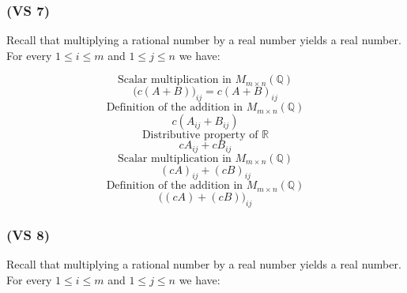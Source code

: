 \documentclass{article}
\begin{document}
\subsubsection*{(VS 7)}
Recall that multiplying a rational number by a real number yields a real number.
For every \(1 \leq i \leq m\) and \(1 \leq j \leq n\) we have:

\begin{equation*}
    \text{Scalar multiplication in \(M_{m \times n}(\mathbb{Q})\)}
\end{equation*}
\begin{equation*}
    \Big(c(A + B)\Big)_{ij} = c(A + B)_{ij}
\end{equation*}
\begin{equation*}
    \text{Definition of the addition in \(M_{m \times n}(\mathbb{Q})\)}
\end{equation*}
\begin{equation*}
    c(A_{ij} + B_{ij})
\end{equation*}
\begin{equation*}
    \text{Distributive property of \(\mathbb{R}\)}
\end{equation*}
\begin{equation*}
    cA_{ij} + cB_{ij}
\end{equation*}
\begin{equation*}
    \text{Scalar multiplication in \(M_{m \times n}(\mathbb{Q})\)}
\end{equation*}
\begin{equation*}
    (cA)_{ij} + (cB)_{ij}
\end{equation*}
\begin{equation*}
    \text{Definition of the addition in \(M_{m \times n}(\mathbb{Q})\)}
\end{equation*}
\begin{equation*}
    \Big((cA) + (cB)\Big)_{ij}
\end{equation*}

\subsubsection*{(VS 8)}

Recall that multiplying a rational number by a real number yields a real number.
For every \(1 \leq i \leq m\) and \(1 \leq j \leq n\) we have:
\end{document}
